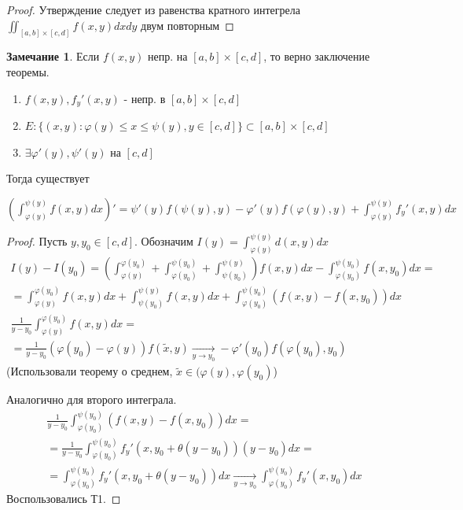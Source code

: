 \documentclass{article}
\theoremstyle{definition}
\numberwithin{theorem}{section}
\numberwithin{lemma}{section}
\numberwithin{definition}{section}
\numberwithin{corollary}{section}
\newtheorem*{remark}{Замечание}
\numberwithin{equation}{section}
\let\phi\varphi
\begin{document}
\begin{proof}
  Утверждение следует из равенства кратного интегрела $\iint_{[a,b]\times [c,d]}f(x,y)dxdy$ двум повторным
\end{proof}
\begin{remark}
  Если $f(x,y)$ непр. на $[a,b]\times [c,d]$, то верно заключение теоремы.
\end{remark}
\begin{theorem}
  \phantom{.}

  \begin{enumerate}
    \item $f(x,y), f_y'(x,y)$ - непр. в $[a,b]\times [c,d]$
    \item $E:\{(x,y): \phi(y) \le x \le \psi(y), y\in [c,d]\}\subset [a,b]\times [c,d]$
    \item $\exists \phi'(y),\psi'(y)$ на $[c,d]$
  \end{enumerate}
  Тогда существует

  $\left(\int_{\phi(y)}^{\psi(y)}f(x,y)dx\right)'=\psi'(y)f(\psi(y),y)-\phi'(y)f(\phi(y),y)+\int_{\phi(y)}^{\psi(y)}f_y'(x,y)dx$
\end{theorem}
\begin{proof}
  Пусть $y,y_0\in[c,d]$. Обозначим $I(y)=\int_{\phi(y)}^{\psi(y)}d(x,y)dx$
  \begin{gather*}
    I(y)-I(y_0)=(\int_{\phi(y)}^{\phi(y_0)}+\int_{\phi(y_0)}^{\psi(y_0)}+\int_{\psi(y_0)}^{\psi(y)})f(x,y)dx - \int_{\phi(y_0)}^{\psi(y_0)}f(x,y_0)dx = \\ 
    = \int_{\phi(y)}^{\phi(y_0)}f(x,y)dx+\int_{\psi(y_0)}^{\psi(y)}f(x,y)dx+\int_{\phi(y_0)}^{\psi(y_0)}(f(x,y)-f(x,y_0))dx \\ 
    \frac{1}{y-y_0}\int_{\phi(y)}^{\phi(y_0)}f(x,y)dx= \\ 
    = \frac{1}{y-y_0}(\phi(y_0)-\phi(y))f(\tilde{x},y) \underset{y\to y_0}{\to} -\phi'(y_0)f(\phi(y_0), y_0)
  \end{gather*}
  (Использовали теорему о среднем, $\tilde{x} \in (\phi(y), \phi(y_0)$)

  Аналогично для второго интеграла.
  \begin{gather*}
    \frac{1}{y-y_0}\int_{\phi(y_0)}^{\psi(y_0)}(f(x,y)-f(x,y_0))dx= \\ 
     = \frac{1}{y-y_0}\int_{\phi(y_0)}^{\psi(y_0)}f_y'(x,y_0+\theta(y-y_0))(y-y_0)dx = \\ 
     = \int_{\phi(y_0)}^{\psi(y_0)}f_y'(x,y_0+\theta(y-y_0))dx \underset{y\to y_0}{\to}\int_{\phi(y_0)}^{\psi(y_0)}f_y'(x,y_0)dx
  \end{gather*}
  Воспользовались Т1.
\end{proof}
\end{document}
